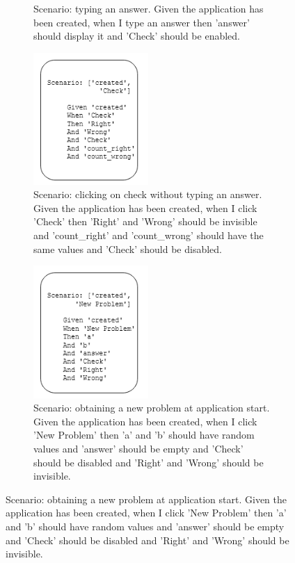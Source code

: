 \begin{figure}[H]
\begin{subfigure}[b]{0.48\textwidth}
        \caption{Scenario: typing an answer. Given the application has been created, when I type an answer then 'answer' should display it and 'Check' should be enabled.}
    \end{subfigure}\hfill%
    \begin{subfigure}[b]{0.48\textwidth}
        \centering
        \includegraphics[width=0.48\textwidth]{images/scenarios_3.png}
        \caption{Scenario: clicking on check without typing an answer. Given the application has been created, when I click 'Check' then 'Right' and 'Wrong' should be invisible and 'count\_right' and 'count\_wrong' should have the same values and 'Check' should be disabled. }
   \end{subfigure}\hfill%
   \begin{subfigure}[b]{0.48\textwidth}
    \centering
    \includegraphics[width=0.48\textwidth]{images/scenarios_4.png}
    \caption{Scenario: obtaining a new problem at application start. Given the application has been created, when I click 'New Problem' then 'a' and 'b' should have random values and 'answer' should be empty and 'Check' should be disabled and 'Right' and 'Wrong' should be invisible.}
\end{subfigure}\hfill%
\end{figure}

